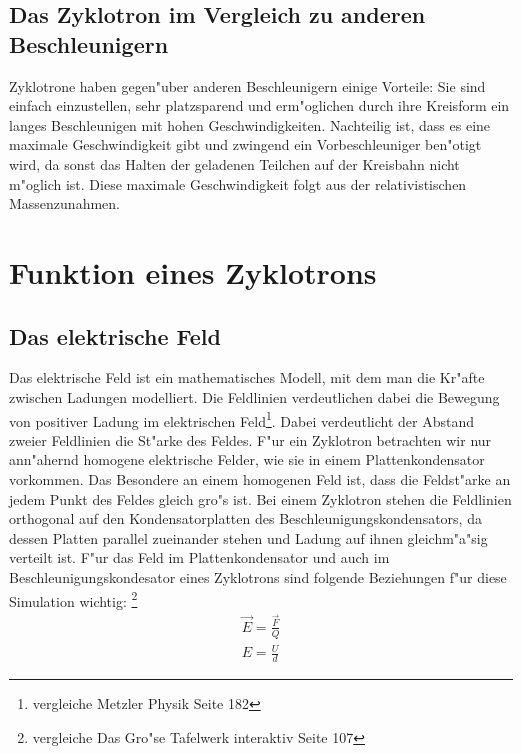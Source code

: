 \documentclass[14pt, a4paper]{report}
\begin{document}
\section{Das Zyklotron im Vergleich zu anderen Beschleunigern}
Zyklotrone haben gegen"uber anderen Beschleunigern einige Vorteile: Sie sind einfach
einzustellen, sehr  platzsparend und erm"oglichen durch ihre Kreisform  ein langes
Beschleunigen mit hohen Geschwindigkeiten. Nachteilig ist, dass es eine maximale
Geschwindigkeit gibt und zwingend ein Vorbeschleuniger ben"otigt wird, da sonst das 
Halten der geladenen Teilchen auf der Kreisbahn nicht m"oglich ist. Diese maximale
Geschwindigkeit folgt aus der relativistischen Massenzunahmen.

\chapter{Funktion eines Zyklotrons}
\section{Das elektrische Feld}
Das elektrische Feld ist ein mathematisches Modell, 
mit dem man die Kr"afte zwischen
Ladungen modelliert. Die Feldlinien verdeutlichen dabei die Bewegung von positiver 
Ladung im elektrischen Feld\footnote{vergleiche Metzler Physik Seite 182}.
Dabei verdeutlicht der Abstand zweier
Feldlinien die St"arke des Feldes. F"ur ein Zyklotron betrachten wir nur ann"ahernd
homogene elektrische Felder, wie sie in einem Plattenkondensator vorkommen. Das Besondere an 
einem homogenen Feld ist, dass die Feldst"arke an jedem Punkt des Feldes gleich gro"s
ist. Bei einem Zyklotron stehen die Feldlinien orthogonal auf den Kondensatorplatten
des Beschleunigungskondensators, da dessen Platten parallel zueinander stehen und Ladung
auf ihnen gleichm"a"sig verteilt ist.
F"ur das Feld im Plattenkondensator und auch im Beschleunigungskondesator eines Zyklotrons
sind folgende Beziehungen f"ur diese Simulation wichtig:
\footnote{vergleiche Das Gro"se Tafelwerk interaktiv Seite 107}
\begin{eqnarray} \label{E-Feld-Gleichungen}
\vec{E} = \frac{\vec{F}}{Q} \\
E = \frac{U}{d}
\end{eqnarray}
\end{document}
